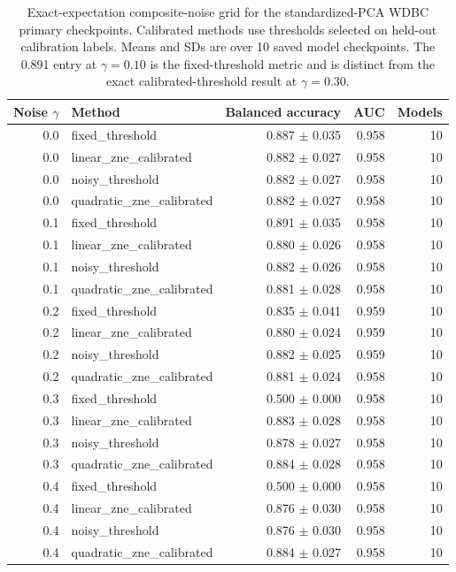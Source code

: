 \documentclass[10pt]{article}
\begin{document}
\begin{table}[t]\centering\scriptsize
\caption{Exact-expectation composite-noise grid for the standardized-PCA WDBC primary checkpoints. Calibrated methods use thresholds selected on held-out calibration labels. Means and SDs are over 10 saved model checkpoints. The 0.891 entry at $\gamma=0.10$ is the fixed-threshold metric and is distinct from the exact calibrated-threshold result at $\gamma=0.30$.}
\label{tab:stdnoise}
\begin{tabular}{@{}r l r r r@{}}\toprule
Noise $\gamma$ & Method & Balanced accuracy & AUC & Models \\ \midrule
0.0 & fixed\_threshold & 0.887 $\pm$ 0.035 & 0.958 & 10 \\
0.0 & linear\_zne\_calibrated & 0.882 $\pm$ 0.027 & 0.958 & 10 \\
0.0 & noisy\_threshold & 0.882 $\pm$ 0.027 & 0.958 & 10 \\
0.0 & quadratic\_zne\_calibrated & 0.882 $\pm$ 0.027 & 0.958 & 10 \\
0.1 & fixed\_threshold & 0.891 $\pm$ 0.035 & 0.958 & 10 \\
0.1 & linear\_zne\_calibrated & 0.880 $\pm$ 0.026 & 0.958 & 10 \\
0.1 & noisy\_threshold & 0.882 $\pm$ 0.026 & 0.958 & 10 \\
0.1 & quadratic\_zne\_calibrated & 0.881 $\pm$ 0.028 & 0.958 & 10 \\
0.2 & fixed\_threshold & 0.835 $\pm$ 0.041 & 0.959 & 10 \\
0.2 & linear\_zne\_calibrated & 0.880 $\pm$ 0.024 & 0.959 & 10 \\
0.2 & noisy\_threshold & 0.882 $\pm$ 0.025 & 0.959 & 10 \\
0.2 & quadratic\_zne\_calibrated & 0.881 $\pm$ 0.024 & 0.958 & 10 \\
0.3 & fixed\_threshold & 0.500 $\pm$ 0.000 & 0.958 & 10 \\
0.3 & linear\_zne\_calibrated & 0.883 $\pm$ 0.028 & 0.958 & 10 \\
0.3 & noisy\_threshold & 0.878 $\pm$ 0.027 & 0.958 & 10 \\
0.3 & quadratic\_zne\_calibrated & 0.884 $\pm$ 0.028 & 0.958 & 10 \\
0.4 & fixed\_threshold & 0.500 $\pm$ 0.000 & 0.958 & 10 \\
0.4 & linear\_zne\_calibrated & 0.876 $\pm$ 0.030 & 0.958 & 10 \\
0.4 & noisy\_threshold & 0.876 $\pm$ 0.030 & 0.958 & 10 \\
0.4 & quadratic\_zne\_calibrated & 0.884 $\pm$ 0.027 & 0.958 & 10 \\
\bottomrule\end{tabular}\end{table}
\end{document}
